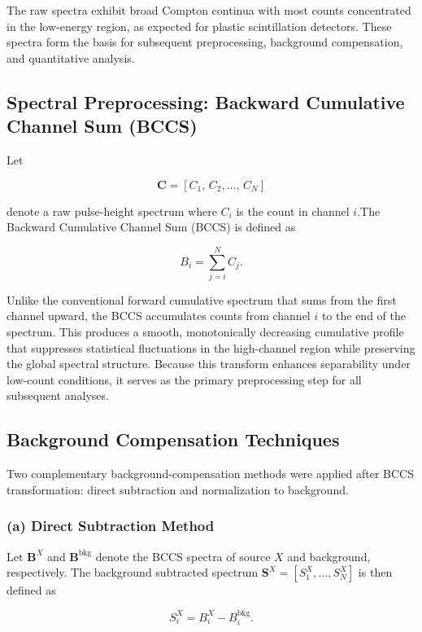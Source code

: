 \documentclass[10pt]{wlscirep}
\begin{document}
The raw spectra exhibit broad Compton continua with most counts concentrated in the low-energy region, as expected for plastic scintillation detectors. These spectra form the basis for subsequent preprocessing, background compensation, and quantitative analysis.

\subsection*{Spectral Preprocessing: Backward Cumulative Channel Sum (BCCS)}

Let

$$
\mathbf{C} = [C_1,\,C_2,\ldots,\,C_N]
$$

denote a raw pulse-height spectrum where $C_i$ is the count in channel $i$.The Backward Cumulative Channel Sum (BCCS) is defined as

\begin{equation}
B_i = \sum_{j=i}^N C_j. \label{eq:BCCS}
\end{equation}

Unlike the conventional forward cumulative spectrum that sums from the first channel upward, the BCCS accumulates counts from channel 
$i$ to the end of the spectrum. This produces a smooth, monotonically decreasing cumulative profile that suppresses statistical fluctuations in the high-channel region while preserving the global spectral structure. Because this transform enhances separability under low-count conditions, it serves as the primary preprocessing step for all subsequent analyses.


\subsection*{Background Compensation Techniques}

Two complementary background-compensation methods were applied after BCCS transformation: direct subtraction and normalization to background.

\subsubsection*{(a) Direct Subtraction Method}

Let $\mathbf{B}^X$ and $\mathbf{B}^\textrm{bkg}$ denote the BCCS spectra of source $X$ and background, respectively. The background subtracted spectrum $\mathbf{S}^X = [S^X_1,\ldots,S^X_N]$ is then defined as

\begin{equation}
S^X_i =  B^X_i - B_i^{\textrm{bkg}}. \label{eq:DS}
\end{equation}
\end{document}
